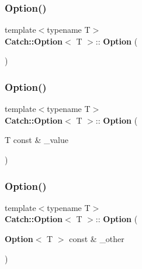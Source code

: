 \subsubsection{Option()\hspace{0.1cm}{\footnotesize\ttfamily [1/3]}}
{\footnotesize\ttfamily template$<$typename T$>$ \\
\textbf{ Catch\+::\+Option}$<$ T $>$\+::\textbf{ Option} (\begin{DoxyParamCaption}{ }\end{DoxyParamCaption})\hspace{0.3cm}{\ttfamily [inline]}}

\mbox{\label{class_catch_1_1_option_a5aeb9c22d48a6882bdf5fb4730b06c86}} 
\subsubsection{Option()\hspace{0.1cm}{\footnotesize\ttfamily [2/3]}}
{\footnotesize\ttfamily template$<$typename T$>$ \\
\textbf{ Catch\+::\+Option}$<$ T $>$\+::\textbf{ Option} (\begin{DoxyParamCaption}\item[{T const \&}]{\+\_\+value }\end{DoxyParamCaption})\hspace{0.3cm}{\ttfamily [inline]}}

\mbox{\label{class_catch_1_1_option_af02f2e4559f06384baec0def8c68c5fd}} 
\subsubsection{Option()\hspace{0.1cm}{\footnotesize\ttfamily [3/3]}}
{\footnotesize\ttfamily template$<$typename T$>$ \\
\textbf{ Catch\+::\+Option}$<$ T $>$\+::\textbf{ Option} (\begin{DoxyParamCaption}\item[{\textbf{ Option}$<$ T $>$ const \&}]{\+\_\+other }\end{DoxyParamCaption})\hspace{0.3cm}{\ttfamily [inline]}}

\mbox{\label{class_catch_1_1_option_a37fe90bb47bb909f150a5ad6be25581a}} 
